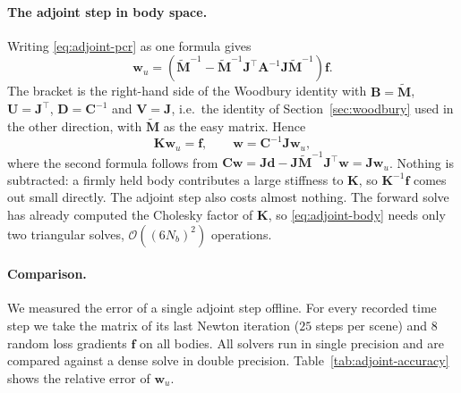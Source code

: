 \paragraph{The adjoint step in body space.}
Writing \eqref{eq:adjoint-pcr} as one formula gives
\begin{equation*}
  \mathbf{w}_u = \left(\tilde{\mathbf{M}}^{-1} - \tilde{\mathbf{M}}^{-1}\mathbf{J}^\top\mathbf{A}^{-1}\mathbf{J}\tilde{\mathbf{M}}^{-1}\right)\mathbf{f} .
\end{equation*}
The bracket is the right-hand side of the Woodbury identity with
$\mathbf{B} = \tilde{\mathbf{M}}$, $\mathbf{U} = \mathbf{J}^\top$,
$\mathbf{D} = \mathbf{C}^{-1}$ and $\mathbf{V} = \mathbf{J}$, i.e.\ the
identity of Section~\ref{sec:woodbury} used in the other direction, with
$\tilde{\mathbf{M}}$ as the easy matrix. Hence
\begin{equation}
  \mathbf{K}\mathbf{w}_u = \mathbf{f}, \qquad
  \mathbf{w} = \mathbf{C}^{-1}\mathbf{J}\mathbf{w}_u ,
  \label{eq:adjoint-body}
\end{equation}
where the second formula follows from
$\mathbf{C}\mathbf{w} = \mathbf{J}\mathbf{d} - \mathbf{J}\tilde{\mathbf{M}}^{-1}\mathbf{J}^\top\mathbf{w} = \mathbf{J}\mathbf{w}_u$.
Nothing is subtracted: a firmly held body contributes a large stiffness to
$\mathbf{K}$, so $\mathbf{K}^{-1}\mathbf{f}$ comes out small directly. The
adjoint step also costs almost nothing. The forward solve has already
computed the Cholesky factor of $\mathbf{K}$, so \eqref{eq:adjoint-body}
needs only two triangular solves, $\mathcal{O}((6N_b)^2)$ operations.

\paragraph{Comparison.}
We measured the error of a single adjoint step offline. For every
recorded time step we take the matrix of its last Newton iteration
($25$ steps per scene) and $8$ random loss gradients $\mathbf{f}$ on all
bodies. All solvers run in single precision and are compared against a
dense solve in double precision. Table~\ref{tab:adjoint-accuracy} shows
the relative error of $\mathbf{w}_u$.

